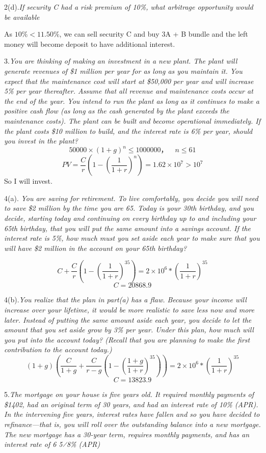 \documentclass[10pt, a4paper]{article}
\begin{document}
2(d).\emph{If security C had a risk premium of 10\%, what arbitrage opportunity would be available}\

As $10\% < 11.50\%$, we can sell security C and buy 3A + B bundle and the left money will become deposit to have additional interest. 

\medskip


3.\emph{You are thinking of making an investment in a new plant. The plant will generate revenues of \$1 million per year for as long as you maintain it. You expect that the maintenance cost will start at \$50,000 per year and will increase 5\% per year thereafter. Assume that all revenue and maintenance costs occur at the end of the year. You intend to run the plant as long as it continues to make a positive cash flow (as long as the cash generated by the plant exceeds the maintenance costs). The plant can be built and become operational immediately. If the plant costs \$10 million to build, and the interest rate is 6\% per year, should you invest in the plant?}
$$50000 \times (1 + g) ^ n \leqslant 1000000，\quad n \leqslant 61$$
$$PV = \frac{C}{r}(1 - (\frac{1}{1 + r})^n) = 1.62 \times 10^7 > 10^7$$
So I will invest.
\medskip 

4(a). \emph{You are saving for retirement. To live comfortably, you decide you will need to save \$2 million by the time you are 65. Today is your 30th birthday, and you decide, starting today and continuing on every birthday up to and including your 65th birthday, that you will put the same amount into a savings account. If the interest rate is 5\%, how much must you set aside each year to make sure that you will have \$2 million in the account on your 65th birthday?}

$$C + \frac{C}{r}(1 - (\frac{1}{1 + r})^{35}) = 2\times 10^6 * (\frac{1}{1 + r})^{35}$$
$$C = 20868.9$$

4(b).\emph{You realize that the plan in part(a) has a flaw. Because your income will increase over your lifetime, it would be more realistic to save less now and more later. Instead of putting the same amount aside each year, you decide to let the amount that you set aside grow by 3\% per year. Under this plan, how much will you put into the account today? (Recall that you are planning to make the first contribution to the account today.)}
$$(1 + g)(\frac{C}{1 + g} + \frac{C}{r - g}(1 - (\frac{1 + g}{1 + r})^{35})) = 2 \times 10^6 * (\frac{1}{1 + r})^{35}$$
$$C = 13823.9$$
\medskip

5.\emph{The mortgage on your house is five years old. It required monthly payments of \$1402, had an original term of 30 years, and had an interest rate of 10\% (APR). In the intervening five years, interest rates have fallen and so you have decided to refinance—that is, you will roll over the outstanding balance into a new mortgage. The new mortgage has a 30-year term, requires monthly payments, and has an interest rate of 6 5⁄8\% (APR)}
\end{document}
